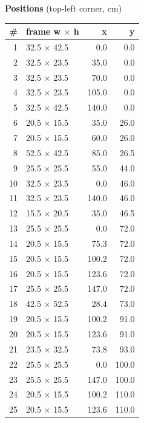\documentclass[a4paper,landscape,10pt]{article}
\begin{document}
\begin{minipage}[t]{0.25\textwidth}
\vspace{8pt}
{\bfseries Positions} (top-left corner, cm)\\[2pt]
\tiny
\begin{tabular}{@{}r l r r@{}}
\toprule
\# & frame w $\times$ h & x & y \\
\midrule
1 & 32.5 $\times$ 42.5 & 0.0 & 0.0 \\
2 & 32.5 $\times$ 23.5 & 35.0 & 0.0 \\
3 & 32.5 $\times$ 23.5 & 70.0 & 0.0 \\
4 & 32.5 $\times$ 23.5 & 105.0 & 0.0 \\
5 & 32.5 $\times$ 42.5 & 140.0 & 0.0 \\
6 & 20.5 $\times$ 15.5 & 35.0 & 26.0 \\
7 & 20.5 $\times$ 15.5 & 60.0 & 26.0 \\
8 & 52.5 $\times$ 42.5 & 85.0 & 26.5 \\
9 & 25.5 $\times$ 25.5 & 55.0 & 44.0 \\
10 & 32.5 $\times$ 23.5 & 0.0 & 46.0 \\
11 & 32.5 $\times$ 23.5 & 140.0 & 46.0 \\
12 & 15.5 $\times$ 20.5 & 35.0 & 46.5 \\
13 & 25.5 $\times$ 25.5 & 0.0 & 72.0 \\
14 & 20.5 $\times$ 15.5 & 75.3 & 72.0 \\
15 & 20.5 $\times$ 15.5 & 100.2 & 72.0 \\
16 & 20.5 $\times$ 15.5 & 123.6 & 72.0 \\
17 & 25.5 $\times$ 25.5 & 147.0 & 72.0 \\
18 & 42.5 $\times$ 52.5 & 28.4 & 73.0 \\
19 & 20.5 $\times$ 15.5 & 100.2 & 91.0 \\
20 & 20.5 $\times$ 15.5 & 123.6 & 91.0 \\
21 & 23.5 $\times$ 32.5 & 73.8 & 93.0 \\
22 & 25.5 $\times$ 25.5 & 0.0 & 100.0 \\
23 & 25.5 $\times$ 25.5 & 147.0 & 100.0 \\
24 & 20.5 $\times$ 15.5 & 100.2 & 110.0 \\
25 & 20.5 $\times$ 15.5 & 123.6 & 110.0 \\
\bottomrule
\end{tabular}
\end{minipage}
\clearpage
\end{document}
